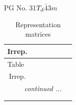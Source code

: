 \documentclass[fleqn,8pt,landscape]{jsarticle}
\begin{document}
\setcounter{MaxMatrixCols}{32}

\renewcommand{\tablename}{Table~}
\renewcommand{\figurename}{Figure~}
\begin{center}
\LARGE
PG No. 31\quad$T_{\rm d}$\quad$\bar{4}3m$\quad[ cubic ]
\end{center}
\renewcommand{\arraystretch}{1.2}
\begin{longtable}{ccccccc}
\caption{Representation matrices}
 \\
 \hline \hline
Irrep. &  &  &  &  &  &  \\ \hline \endfirsthead

\multicolumn{6}{l}{\tablename\ \thetable{}} \\
 \hline \hline
Irrep. &  &  &  &  &  &  \\ \hline \endhead

 \hline \hline
\multicolumn{6}{r}{\footnotesize\it continued ...} \\ \endfoot

 \hline \hline
\multicolumn{6}{r}{} \\ \endlastfoot


\end{longtable}
\end{document}
